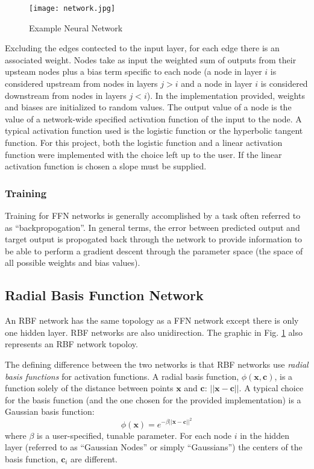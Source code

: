 \documentclass[conference]{IEEEtran}
\begin{document}
  \begin{figure}
    \centering
    \texttt{[image: network.jpg]}
    \caption{Example Neural Network}
    \label{fig:exampleNetwork}
  \end{figure}

  Excluding the edges contected to the input layer, for each edge there is an associated weight. Nodes take as input the weighted sum of outputs from their upsteam nodes plus a bias term specific to each node (a node in layer $i$ is considered upstream from nodes in layers $j>i$ and a node in layer $i$ is considered downstream from nodes in layers $j<i$). In the implementation provided, weights and biases are initialized to random values. The output value of a node is the value of a network-wide specified activation function of the input to the node. A typical activation function used is the logistic function or the hyperbolic tangent function. For this project, both the logistic function and a linear activation function were implemented with the choice left up to the user. If the linear activation function is chosen a slope must be supplied.

    \subsubsection{Training}
    Training for FFN networks is generally accomplished by a task often referred to as ``backpropogation''. In general terms, the error between predicted output and target output is propogated back through the network to provide information to be able to perform a gradient descent through the parameter space (the space of all possible weights and bias values).
  
  \subsection{Radial Basis Function Network}
  An RBF network has the same topology as a FFN network except there is only one hidden layer. RBF networks are also unidirection. The graphic in Fig. \ref{fig:exampleNetwork} also represents an RBF network topoloy.

  The defining difference between the two networks is that RBF networks use \textit{radial basis functions} for activation functions. A radial basis function, $\phi(\mathbf{x}, \mathbf{c})$, is a function solely of the distance between points $\mathbf{x}$ and $\mathbf{c}$: $||\mathbf{x} - \mathbf{c}||$. A typical choice for the basis function (and the one chosen for the provided implementation) is a Gaussian basis function:
  \begin{equation} \label{eq:rbf}
    \phi(\mathbf{x}) = e^{-\beta ||\mathbf{x} - \mathbf{c}||^2}
  \end{equation}
  where $\beta$ is a user-specified, tunable parameter.
  For each node $i$ in the hidden layer (referred to as ``Gaussian Nodes'' or simply ``Gaussians'') the centers of the basis function, $\mathbf{c}_i$ are different.
\end{document}
